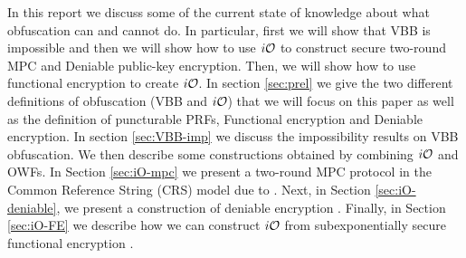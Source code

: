 In this report we discuss some of the current state of knowledge about what obfuscation can and cannot do. In particular, first we will show that VBB is impossible and then we will show how to use $i\mathcal{O}$ to construct secure two-round MPC and Deniable public-key encryption. Then, we will show how to use functional encryption to create $i\mathcal{O}$.
In section \ref{sec:prel} we give the two different definitions of obfuscation (VBB and $i\mathcal{O}$) that we will focus on this paper as well as the definition of puncturable PRFs, Functional encryption and Deniable encryption.
In section \ref{sec:VBB-imp} we discuss the impossibility results on VBB obfuscation. 
We then describe some constructions obtained by combining $i\mathcal{O}$ and OWFs. In Section \ref{sec:iO-mpc} we present a two-round MPC protocol in the Common Reference String (CRS) model due to \cite{MPC-iO}. Next, in Section \ref{sec:iO-deniable}, we present a construction of deniable encryption \cite{iO-deniable}. Finally, in Section \ref{sec:iO-FE} we describe how we can construct $i\mathcal{O}$ from subexponentially secure functional encryption 
\cite{iO-FE}.


